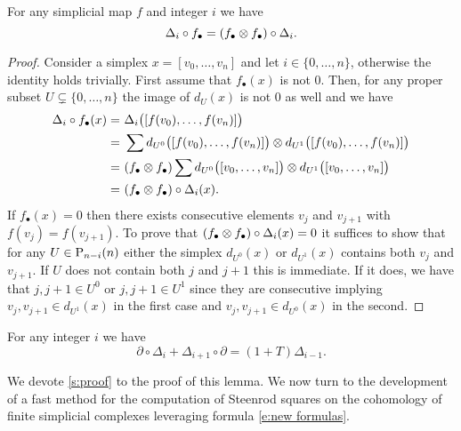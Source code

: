 \begin{lemma} \label{l:naturality}
	For any simplicial map $f$ and integer $i$ we have
	\begin{equation*}
	\Delta_i \circ f_\bullet = (f_\bullet \ot f_\bullet) \circ \Delta_i.
	\end{equation*}
\end{lemma}

\begin{proof}
	Consider a simplex $x = [v_0, \dots, v_n]$ and let $i \in \{0, \dots, n\}$, otherwise the identity holds trivially.
	First assume that $f_\bullet(x)$ is not $0$.
	Then, for any proper subset $U \subsetneq \{0, \dots, n\}$ the image of $d_U(x)$ is not $0$ as well and we have
	\begin{align*}
	\Delta_i \circ f_\bullet(x) =\ &
	\Delta_i \big([f(v_0), \dots, f(v_n)]\big) \\ =\ &
	\sum d_{U^0} \big([f(v_0), \dots, f(v_n)]\big) \ot d_{U^1} \big([f(v_0), \dots, f(v_n)]\big) \\ =\ &
	(f_\bullet \ot f_\bullet) \sum d_{U^0} \big([v_0, \dots, v_n]\big) \ot d_{U^1} \big([v_0, \dots, v_n]\big) \\ =\ &
	(f_\bullet \ot f_\bullet) \circ \Delta_i(x).
	\end{align*}
	If $f_\bullet(x) = 0$ then there exists consecutive elements $v_j$ and $v_{j+1}$ with $f(v_j) = f(v_{j+1})$.
	To prove that $(f_\bullet \ot f_\bullet) \circ \Delta_i(x) = 0$ it suffices to show that for any $U \in \P_{n-i}(n)$ either the simplex $d_{U^0}(x)$ or $d_{U^1}(x)$ contains both $v_j$ and $v_{j+1}$.
	If $U$ does not contain both $j$ and $j+1$ this is immediate.
	If it does, we have that $j, j+1 \in U^0$ or $j, j+1 \in U^1$ since they are consecutive implying $v_j, v_{j+1} \in d_{U^1}(x)$ in the first case and $v_j, v_{j+1} \in d_{U^0}(x)$ in the second.
\end{proof}

\begin{lemma} \label{l:main}
	For any integer $i$ we have
	\begin{equation*}
	\partial \circ \Delta_{i} + \Delta_{i+1} \circ \partial = (1+T) \Delta_{i-1}.
	\end{equation*}
\end{lemma}

We devote \cref{s:proof} to the proof of this lemma.
We now turn to the development of a fast method for the computation of Steenrod squares on the cohomology of finite simplicial complexes leveraging formula \eqref{e:new formulas}.